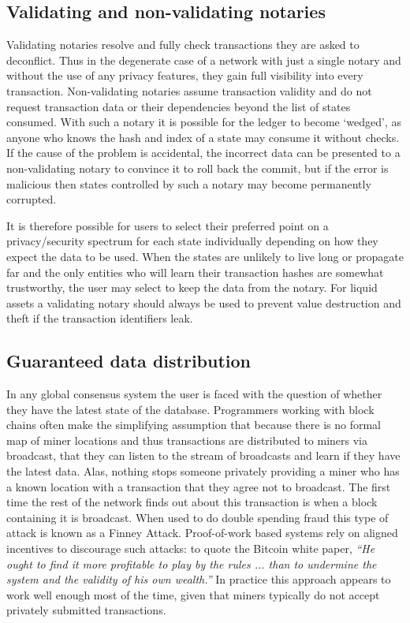 \documentclass{article}
\begin{document}
\subsection{Validating and non-validating notaries}\label{sec:non-validating-notaries}

Validating notaries resolve and fully check transactions they are asked to deconflict. Thus in the degenerate case
of a network with just a single notary and without the use of any privacy features, they gain full visibility into
every transaction. Non-validating notaries assume transaction validity and do not request transaction data or their
dependencies beyond the list of states consumed. With such a notary it is possible for the ledger to become
`wedged', as anyone who knows the hash and index of a state may consume it without checks. If the cause of the
problem is accidental, the incorrect data can be presented to a non-validating notary to convince it to roll back
the commit, but if the error is malicious then states controlled by such a notary may become permanently corrupted.

It is therefore possible for users to select their preferred point on a privacy/security spectrum for each state
individually depending on how they expect the data to be used. When the states are unlikely to live long or
propagate far and the only entities who will learn their transaction hashes are somewhat trustworthy, the user may
select to keep the data from the notary. For liquid assets a validating notary should always be used to prevent
value destruction and theft if the transaction identifiers leak.

\subsection{Guaranteed data distribution}

In any global consensus system the user is faced with the question of whether they have the latest state of the
database. Programmers working with block chains often make the simplifying assumption that because there is no
formal map of miner locations and thus transactions are distributed to miners via broadcast, that they can listen
to the stream of broadcasts and learn if they have the latest data. Alas, nothing stops someone privately providing
a miner who has a known location with a transaction that they agree not to broadcast. The first time the rest of
the network finds out about this transaction is when a block containing it is broadcast. When used to do double
spending fraud this type of attack is known as a Finney Attack\cite{FinneyAttack}. Proof-of-work based systems rely
on aligned incentives to discourage such attacks: to quote the Bitcoin white paper, \emph{``He ought to find it
more profitable to play by the rules ... than to undermine the system and the validity of his own wealth.''} In
practice this approach appears to work well enough most of the time, given that miners typically do not accept
privately submitted transactions.
\end{document}
